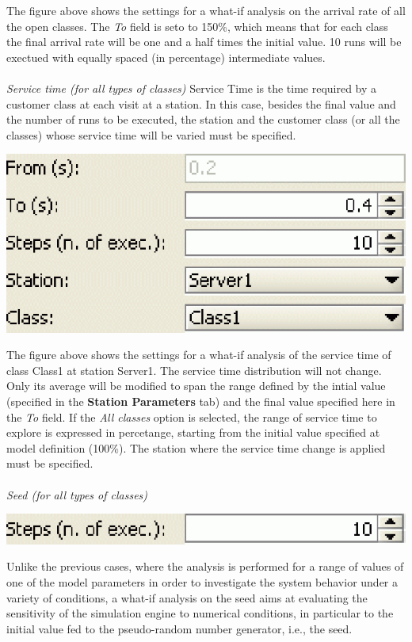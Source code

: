 The figure above shows the settings for a what-if analysis on the arrival rate of all the open classes. The \emph{To} field is seto to 150\%, which means that for each class the final arrival rate will be one and a half times the initial value. 10 runs will be exectued with equally spaced (in percentage) intermediate values.\\\\
\textit{Service time (for all types of classes)}
Service Time is the time required by a customer class at each visit at a station. In this case, besides the final value and the number of runs to be executed, the station and the customer class (or all the classes) whose service time will be varied must be specified.
\begin{center}
\includegraphics[scale=.5]{img/jsim/ex2_service_time.eps}
\end{center}
The figure above shows the settings for a what-if analysis of the service time of class Class1 at station Server1. The service time distribution will not change. Only its average will be modified to span the range defined by the intial value (specified in the \textbf{Station Parameters} tab) and the final value specified here in
the \emph{To} field.
If the \emph{All classes} option is selected, the range of service time to explore is expressed in percetange, starting from the initial value specified at model definition (100\%). The station where the service time change is applied must be specified.\\\\
\textit{Seed (for all types of classes)}
\begin{center}
\includegraphics[scale=.5]{img/jsim/sedd.eps}
\end{center}
Unlike the previous cases, where the analysis is performed for a range of values of one of the model parameters in order to investigate the system behavior under a variety of conditions, a what-if analysis on the seed aims at evaluating the sensitivity of the simulation engine to numerical conditions, in particular to the initial value fed to the pseudo-random number generator, i.e., the seed.
